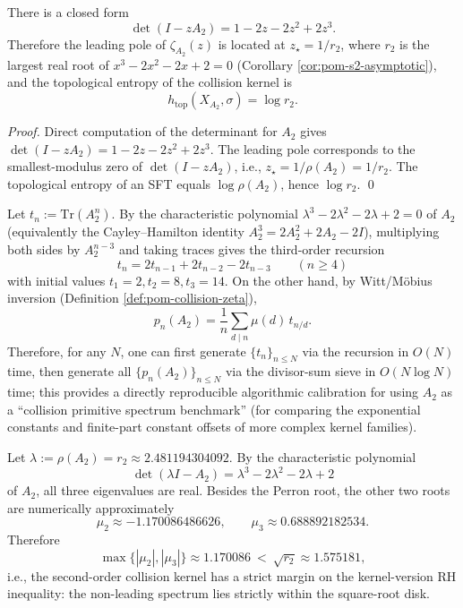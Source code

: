 \begin{proposition}\label{prop:pom-collision-det}
There is a closed form
$$
\det(I-zA_2)=1-2z-2z^2+2z^3.
$$
Therefore the leading pole of \(\zeta_{A_2}(z)\) is located at \(z_\star=1/r_2\), where \(r_2\) is the largest real root of \(x^3-2x^2-2x+2=0\) (Corollary \ref{cor:pom-s2-asymptotic}), and the topological entropy of the collision kernel is
$$
h_{\mathrm{top}}(X_{A_2},\sigma)=\log r_2.
$$
\end{proposition}
\begin{proof}
Direct computation of the determinant for \(A_2\) gives \(\det(I-zA_2)=1-2z-2z^2+2z^3\). The leading pole corresponds to the smallest-modulus zero of \(\det(I-zA_2)\), i.e., \(z_\star=1/\rho(A_2)=1/r_2\). The topological entropy of an SFT equals \(\log\rho(A_2)\), hence \(\log r_2\). \qed
\end{proof}

\begin{remark}\label{rem:pom-a2-primitive-fast}
Let \(t_n:=\mathrm{Tr}(A_2^n)\).
By the characteristic polynomial \(\lambda^3-2\lambda^2-2\lambda+2=0\) of \(A_2\) (equivalently the Cayley--Hamilton identity \(A_2^3=2A_2^2+2A_2-2I\)), multiplying both sides by \(A_2^{n-3}\) and taking traces gives the third-order recursion
\[
\boxed{\;
t_n=2t_{n-1}+2t_{n-2}-2t_{n-3}\qquad(n\ge 4)\;}
\]
with initial values \(t_1=2,t_2=8,t_3=14\).
On the other hand, by Witt/M\"obius inversion (Definition \ref{def:pom-collision-zeta}),
\[
p_n(A_2)=\frac{1}{n}\sum_{d\mid n}\mu(d)\,t_{n/d}.
\]
Therefore, for any \(N\), one can first generate \(\{t_n\}_{n\le N}\) via the recursion in \(O(N)\) time, then generate all \(\{p_n(A_2)\}_{n\le N}\) via the divisor-sum sieve in \(O(N\log N)\) time;
this provides a directly reproducible algorithmic calibration for using \(A_2\) as a ``collision primitive spectrum benchmark'' (for comparing the exponential constants and finite-part constant offsets of more complex kernel families).
\end{remark}

\begin{remark}\label{rem:pom-collision-rh-margin}
Let \(\lambda:=\rho(A_2)=r_2\approx 2.481194304092\). By the characteristic polynomial
\[
\det(\lambda I-A_2)=\lambda^3-2\lambda^2-2\lambda+2
\]
of \(A_2\), all three eigenvalues are real. Besides the Perron root, the other two roots are numerically approximately
\[
\mu_2\approx -1.170086486626,\qquad
\mu_3\approx 0.688892182534.
\]
Therefore
\[
\max\{|\mu_2|,|\mu_3|\}\approx 1.170086\ <\ \sqrt{r_2}\approx 1.575181,
\]
i.e., the second-order collision kernel has a strict margin on the kernel-version RH inequality: the non-leading spectrum lies strictly within the square-root disk.
\end{remark}

